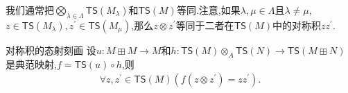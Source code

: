 \begin{convention}{}{}
	我们通常把$\bigotimes\limits_{\lambda\in\Lambda}\mathsf{TS}\left(M_{\lambda}\right)$和$\mathsf{TS}\left(M\right)$等同.注意,如果$\lambda,\mu\in\Lambda$且$\lambda\neq\mu$,$z\in\mathsf{TS}\left(M_{\lambda}\right),z^{\prime}\in\mathsf{TS}\left(M_{\mu}\right)$,那么$z\otimes z^{\prime}$等同于二者在$\mathsf{TS}\left(M\right)$中的对称积$zz^{\prime}$.
\end{convention}

\begin{proposition}{对称积的态射刻画}{}
	设$u:M\boxplus M\to M$和$h:\mathsf{TS}\left(M\right)\otimes_{A}\mathsf{TS}\left(N\right)\to\mathsf{TS}\left(M\boxplus N\right)$是典范映射,$f=\mathsf{TS}\left(u\right)\circ h$,则
	\begin{align*}
		\forall z,z^{\prime}\in\mathsf{TS}\left(M\right)\left(f\left(z\otimes z^{\prime}\right)=zz^{\prime}\right).
	\end{align*}
\end{proposition}













































